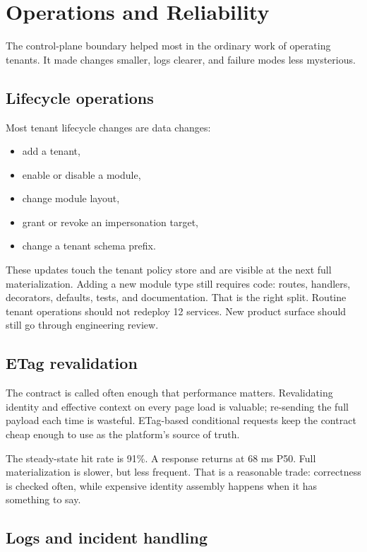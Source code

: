 \section{Operations and Reliability}
\label{sec:operations}

The control-plane boundary helped most in the ordinary work of operating tenants. It made changes smaller, logs clearer, and failure modes less mysterious.

\subsection{Lifecycle operations}

Most tenant lifecycle changes are data changes:

\begin{itemize}
  \item add a tenant,
  \item enable or disable a module,
  \item change module layout,
  \item grant or revoke an impersonation target,
  \item change a tenant schema prefix.
\end{itemize}

These updates touch the tenant policy store and are visible at the next full materialization. Adding a new module type still requires code: routes, handlers, decorators, defaults, tests, and documentation. That is the right split. Routine tenant operations should not redeploy 12 services. New product surface should still go through engineering review.

\subsection{ETag revalidation}

The  contract is called often enough that performance matters. Revalidating identity and effective context on every page load is valuable; re-sending the full payload each time is wasteful. ETag-based conditional requests keep the contract cheap enough to use as the platform's source of truth.

The steady-state hit rate is 91\%. A  response returns at 68 ms P50. Full materialization is slower, but less frequent. That is a reasonable trade: correctness is checked often, while expensive identity assembly happens when it has something to say.

\subsection{Logs and incident handling}

